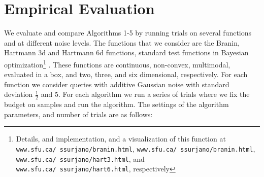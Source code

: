 \documentclass[11pt]{article}
\begin{document}
\section{Empirical Evaluation}
We evaluate and compare Algorithms 1-5 by running trials on several functions and at different noise levels. The functions that we consider are the Branin, Hartmann 3d and Hartmann 6d functions, standard test functions in Bayesian optimization\footnote{Details, and implementation, and a visualization of this function at \texttt{www.sfu.ca/~ssurjano/branin.html}, \texttt{www.sfu.ca/~ssurjano/branin.html}, \texttt{www.sfu.ca/~ssurjano/hart3.html}, and \texttt{www.sfu.ca/~ssurjano/hart6.html}, respectively} \cite{Hoffman2011}. These functions are continuous, non-convex, multimodal, evaluated in a box, and two, three, and six dimensional, respectively. For each function we consider queries with additive Gaussian noise with standard deviation $\frac{1}{2}$ and $5$. For each algorithm we run a series of trials where we fix the budget on samples and run the algorithm. The settings of the algorithm parameters, and number of trials are as follows:
\end{document}
